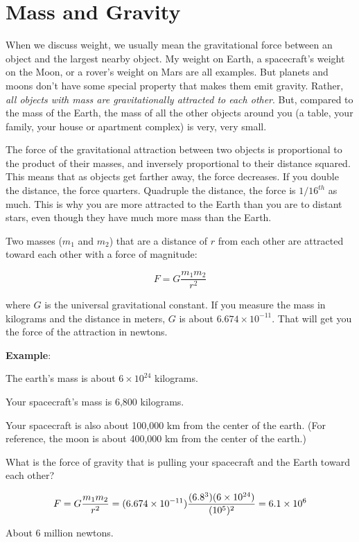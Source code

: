 \section{Mass and Gravity}
When we discuss weight, we usually mean the gravitational force between an object and the largest nearby object. My weight on Earth, a spacecraft's weight on the Moon, or a rover's weight on Mars are all examples. But planets and moons don't have some special property that makes them emit gravity. Rather, \textit{all objects with mass are gravitationally attracted to each other}. But, compared to the mass of the Earth, the mass of all the other objects around you (a table, your family, your house or apartment complex) is very, very small. 

The
force of the gravitational attraction between two objects is proportional to the product
of their masses, and inversely proportional to their distance squared.
This means that as objects get farther away, the force decreases. If you double the distance, the force quarters. Quadruple the distance, the force is $1/16^{th}$ as much. 
This is why you are more attracted to the Earth than you are to
distant stars, even though they have much more mass than the Earth.

\begin{mdframed}[style=important, frametitle={Newton's Law of Universal Gravitation}]

Two masses ($m_1$ and $m_2$) that are a distance of
$r$ from each other are attracted toward each other with a force of
magnitude:

$$F = G\frac{m_1 m_2}{r^2}$$

where $G$ is the universal gravitational constant. If you measure the
mass in kilograms and the distance in meters, $G$ is about $6.674
\times 10^{-11}$. That will get you the force of the attraction in
newtons.

\end{mdframed}

\textbf{Example}: %

\begin{Exercise}[title={Gravity}, label=gravity_earth]

  The earth's mass is about $6 \times 10^{24}$ kilograms.

  Your spacecraft's mass is 6,800 kilograms.

  Your spacecraft is also about 100,000 km from the center of the earth. (For 
  reference, the moon is about 400,000 km from the center of the earth.)

  What is the force of gravity that is pulling your spacecraft and the Earth 
  toward each other?

\end{Exercise}
\begin{Answer}[ref=gravity_earth]

  $$F = G\frac{m_1 m_2}{r^2} = (6.674 \times 10^{-11})\frac{(6.8 \time 10^3)(6 
  \times 10^{24})}{(10^5)^2} = 6.1 \times 10^{6}$$

  About 6 million newtons.

\end{Answer}


